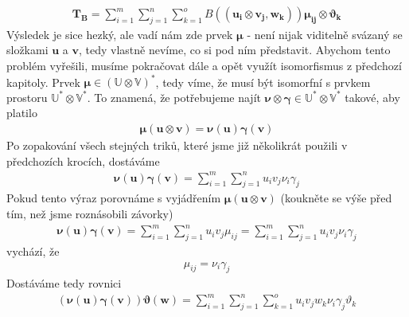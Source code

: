 \documentclass[a5paper,12pt]{amsbook}
\theoremstyle{definition}
\newcommand{\myvec}[1]{\bm{#1}}
\newcommand{\myspace}[1]{\mathbb{#1}}
\begin{document}
\begin{equation*}
\begin{split}
\myvec{T_B} =
  \sum_{i=1}^{m}\sum_{j=1}^{n}\sum_{k=1}^{o} B((\myvec{u_i}\otimes\myvec{v_j}, \myvec{w_k}))
    \myvec{\mu_{ij}\otimes\myvec{\vartheta_k}}
\end{split}
\end{equation*}
Výsledek je sice hezký, ale vadí nám zde prvek $\myvec{\mu}$ - není nijak viditelně svázaný se složkami
$\myvec{u}$ a $\myvec{v}$, tedy vlastně nevíme, co si pod ním představit. Abychom tento problém
vyřešili, musíme pokračovat dále a opět využít isomorfismus z předchozí kapitoly. Prvek
$\myvec{\mu}\in(\myspace{U}\otimes\myspace{V})^*$, tedy víme, že musí být isomorfní s prvkem
prostoru $\myspace{U}^*\otimes\myspace{V}^*$. To znamená, že potřebujeme najít
$\myvec{\nu}\otimes\myvec{\gamma}\in\myspace{U}^*\otimes\myspace{V}^*$ takové, aby platilo
\begin{equation*}
\begin{split}
\myvec{\mu}(\myvec{u}\otimes\myvec{v}) = \myvec{\nu}(\myvec{u})\myvec{\gamma}(\myvec{v})
\end{split}
\end{equation*}
Po zopakování všech stejných triků, které jsme již několikrát použili v předchozích krocích,
dostáváme
\begin{equation*}
\begin{split}
\myvec{\nu}(\myvec{u})\myvec{\gamma}(\myvec{v}) = \sum_{i=1}^{m}\sum_{j=1}^{n}u_i v_j \nu_i\gamma_j
\end{split}
\end{equation*}
Pokud tento výraz porovnáme s vyjádřením $\myvec{\mu}(\myvec{u}\otimes\myvec{v})$ (koukněte se
výše před tím, než jsme roznásobili závorky)
\begin{equation*}
\begin{split}
\myvec{\nu}(\myvec{u})\myvec{\gamma}(\myvec{v}) =
  \sum_{i=1}^{m}\sum_{j=1}^{n}u_i v_j \mu_{ij}
  = \sum_{i=1}^{m}\sum_{j=1}^{n}u_i v_j \nu_i\gamma_j
\end{split}
\end{equation*}
vychází, že
\begin{equation*}
\begin{split}
\mu_{ij} = \nu_i\gamma_j
\end{split}
\end{equation*}
Dostáváme tedy rovnici
\begin{equation*}
\begin{split}
(\myvec{\nu}(\myvec{u})\myvec{\gamma}(\myvec{v}))\myvec{\vartheta}(\myvec{w}) = 
  \sum_{i=1}^{m}\sum_{j=1}^{n}\sum_{k=1}^{o}u_i v_j w_k \nu_i\gamma_j\vartheta_k
\end{split}
\end{equation*}
\end{document}
